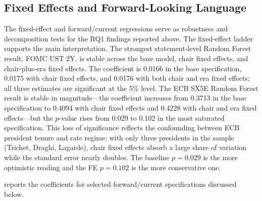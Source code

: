 \subsection{Fixed Effects and Forward-Looking Language}
\label{sec:res_fe_fwd_new}

The fixed-effect and forward/current regressions serve as robustness and
decomposition tests for the RQ1 findings reported above. The fixed-effect
ladder supports the main interpretation. The strongest statement-level Random
Forest result, FOMC UST 2Y, is stable across the base model, chair fixed
effects, and chair-plus-era fixed effects. The coefficient is 0.0166 in the
base specification, 0.0175 with chair fixed effects, and 0.0176 with both
chair and era fixed effects; all three estimates are significant at the 5\%
level. The ECB SX5E Random Forest result is stable in magnitude---the
coefficient increases from 0.3713 in the base specification to 0.4094 with
chair fixed effects and 0.4228 with chair and era fixed effects---but the
$p$-value rises from 0.029 to 0.102 in the most saturated specification. This
loss of significance reflects the confounding between ECB president tenure and
rate regime: with only three presidents in the sample (Trichet, Draghi,
Lagarde), chair fixed effects absorb a large share of variation while the
standard error nearly doubles. The baseline $p=0.029$ is the more optimistic
reading and the FE $p=0.102$ is the more conservative one.

 reports the coefficients for
selected forward/current specifications discussed below.

